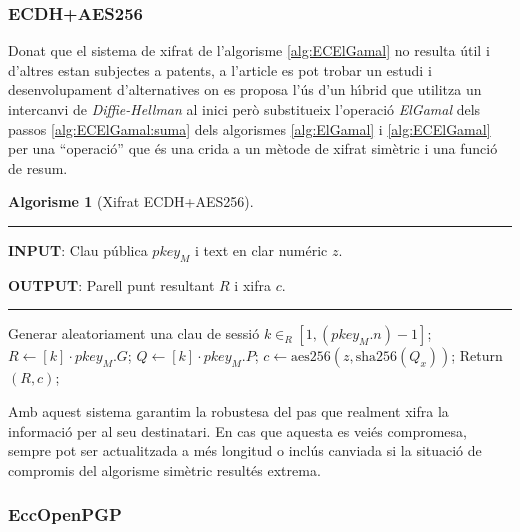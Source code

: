 \documentclass[12pt,twoside,catalan,a4paper]{book}%
\numberwithin{figure}{section}		%
\theoremstyle{definition}   			%
\theoremstyle{saltolinea}   			%
\newtheorem{algo}{Algorisme}
\begin{document}
% 

\subsubsection{ECDH+AES256}

Donat que el sistema de xifrat de l'algorisme \ref{alg:ECElGamal} no resulta \'util i d'altres estan subjectes a patents, a l'article \cite{BM06} es pot trobar un estudi i desenvolupament d'alternatives on es proposa l'\'us d'un h\'{\i}brid que utilitza un intercanvi de \emph{Diffie-Hellman} al inici per\`o substitueix l'operaci\'o \emph{ElGamal} dels passos \ref{alg:ECElGamal:suma} dels algorismes \ref{alg:ElGamal} i \ref{alg:ECElGamal} per una ``operaci\'o'' que \'es una crida a un m\`etode de xifrat sim\`etric i una funci\'o de resum.

\begin{table}[H]
\begin{algo}[Xifrat ECDH+AES256]\label{alg:ecdhAES256}
\parbox[b]{\linewidth}{%
\hrule
\smallskip
{\bf INPUT}: Clau p\'ublica $pkey_{M}$ i text en clar num\'eric $z$.

{\bf OUTPUT}: Parell punt resultant $R$ i xifra $c$.
\vspace{1.5mm}
\hrule
}%
\begin{algorithmic}[1]
\STATE Generar aleatoriament una clau de sessi\'o $k\in_{R}\left[1,\left(pkey_{M}.n\right)-1\right]$;
\STATE $R \leftarrow \left[k\right]\cdot pkey_{M}.G$;
\STATE $Q \leftarrow \left[k\right]\cdot pkey_{M}.P$; 
\STATE $c \leftarrow \textrm{aes256}(z,\textrm{sha256}(Q_x))$;
\STATE Return $(R,c)$;
\end{algorithmic}
\end{algo}
\end{table}

Amb aquest sistema garantim la robustesa del pas que realment xifra la informaci\'o per al seu destinatari. En cas que aquesta es vei\'es compromesa, sempre pot ser actualitzada a m\'es longitud o incl\'us canviada si la situaci\'o de compromis del algorisme sim\`etric result\'es extrema.

\subsubsection{EccOpenPGP}\label{subsec:eccopenpgpalg}
\end{document}
